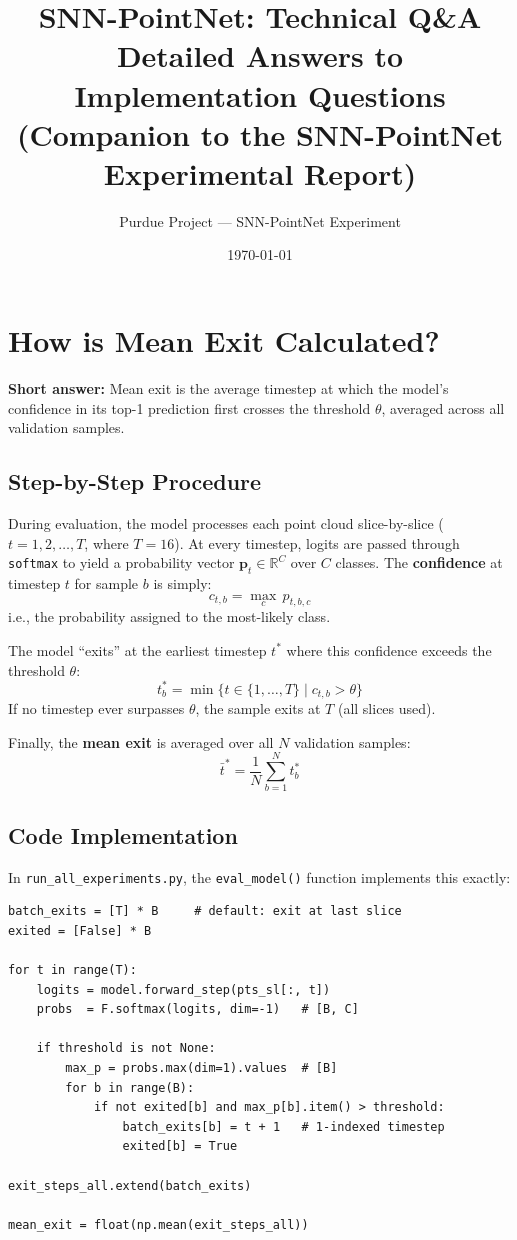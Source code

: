 \documentclass[11pt,a4paper]{article}
\title{%
  \textbf{SNN-PointNet: Technical Q\&A}\\[4pt]
  \large Detailed Answers to Implementation Questions\\
  \normalsize (Companion to the SNN-PointNet Experimental Report)
}
\author{Purdue Project --- SNN-PointNet Experiment}
\date{\today}
\begin{document}
\maketitle
\tableofcontents
\clearpage

\section{How is Mean Exit Calculated?}

\begin{answerbox}
\textbf{Short answer:} Mean exit is the average timestep at which the model's
confidence in its top-1 prediction first crosses the threshold $\theta$,
averaged across all validation samples.
\end{answerbox}

\subsection{Step-by-Step Procedure}

During evaluation, the model processes each point cloud slice-by-slice
($t = 1, 2, \ldots, T$, where $T=16$). At every timestep, logits are passed
through \texttt{softmax} to yield a probability vector $\mathbf{p}_t \in
\mathbb{R}^C$ over $C$ classes. The \textbf{confidence} at timestep $t$
for sample $b$ is simply:
\[
  c_{t,b} = \max_{c} \, p_{t,b,c}
\]
i.e., the probability assigned to the most-likely class.

The model ``exits'' at the earliest timestep $t^*$ where this confidence
exceeds the threshold $\theta$:
\[
  t^*_b = \min\bigl\{t \in \{1,\ldots,T\} \;\big|\; c_{t,b} > \theta\bigr\}
\]
If no timestep ever surpasses $\theta$, the sample exits at $T$ (all slices used).

Finally, the \textbf{mean exit} is averaged over all $N$ validation samples:
\[
  \boxed{\bar{t}^* = \frac{1}{N}\sum_{b=1}^{N} t^*_b}
\]

\subsection{Code Implementation}

In \texttt{run\_all\_experiments.py}, the \texttt{eval\_model()} function
implements this exactly:

\begin{lstlisting}
batch_exits = [T] * B     # default: exit at last slice
exited = [False] * B

for t in range(T):
    logits = model.forward_step(pts_sl[:, t])
    probs  = F.softmax(logits, dim=-1)   # [B, C]

    if threshold is not None:
        max_p = probs.max(dim=1).values  # [B]
        for b in range(B):
            if not exited[b] and max_p[b].item() > threshold:
                batch_exits[b] = t + 1   # 1-indexed timestep
                exited[b] = True

exit_steps_all.extend(batch_exits)

mean_exit = float(np.mean(exit_steps_all))
\end{lstlisting}
\end{document}
